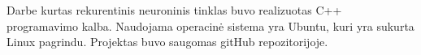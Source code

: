 Darbe kurtas rekurentinis neuroninis tinklas buvo realizuotas C++ programavimo kalba. Naudojama operacinė sistema yra Ubuntu, kuri yra sukurta Linux pagrindu. Projektas buvo saugomas gitHub repozitorijoje.
